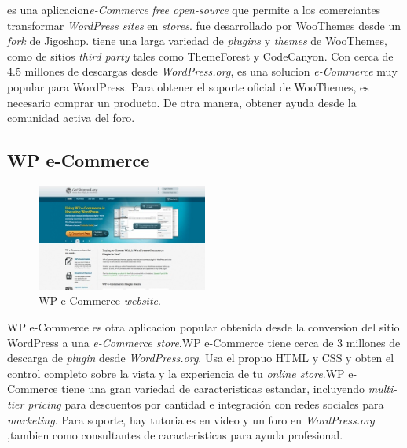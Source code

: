 \nameWooCommerce es una aplicacion\textit{e-Commerce} \textit{free open-source} que permite a los comerciantes transformar \textit{WordPress sites} en \textit{stores}. \nameWooCommerce fue desarrollado por WooThemes desde un \textit{fork} de Jigoshop. \nameWooCommerce tiene una larga variedad de  \textit{plugins} y  \textit{themes} de WooThemes, como de sitios \textit{third party} tales como ThemeForest\cite{online_ThemeForest} y CodeCanyon\cite{online_CodeCanyon}. Con cerca de 4.5 millones de descargas desde \textit{WordPress.org}\cite{online_WordPress}, \nameWooCommerce es una solucion \textit{e-Commerce} muy popular para WordPress. Para obtener el soporte oficial de WooThemes, es necesario comprar un producto. De otra manera, obtener ayuda desde la comunidad activa del foro.

\newcommand{\nameWPECommerce}{WP e-Commerce }
\subsection{\nameWPECommerce}

\begin{figure}[h!]
	\centering
	\includegraphics[width=0.5\textwidth]{figuras/cap1/WPECommerceWebsite.jpg}
	\caption{\nameWPECommerce \textit{website}\cite{online_WPECommerce}.}
\end{figure}

\nameWPECommerce es otra aplicacion popular obtenida desde la conversion del  sitio WordPress a una \textit{e-Commerce store}.\nameWPECommerce tiene cerca de 3 millones de descarga de \textit{plugin} desde \textit{WordPress.org}. Usa el propuo HTML y CSS y obten el control completo sobre la vista y la experiencia de tu \textit{online store}.\nameWPECommerce tiene una gran variedad de caracteristicas estandar, incluyendo \textit{ multi-tier pricing} para descuentos por cantidad e integración con redes sociales para \textit{marketing}. Para soporte, hay tutoriales en video y un foro en  \textit{ WordPress.org} ,tambien como consultantes de caracteristicas para ayuda profesional.

\newcommand{\nameJigoshop}{Jigoshop }
